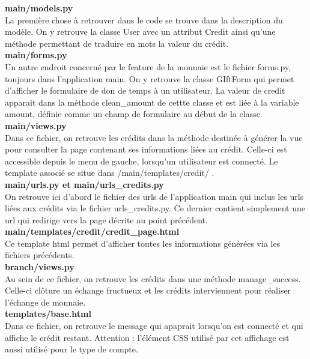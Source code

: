 \textbf{main/models.py}
\\%
La première chose à retrouver dans le code se trouve dans la description du modèle.  On y retrouve la classe User avec un attribut Credit ainsi qu'une méthode permettant de traduire en mots la valeur du crédit.
\\
\textbf{main/forms.py}
\\%
Un autre endroit concerné par le feature de la monnaie est le fichier forms.py,  toujours dans l'application main.  On y retrouve la classe GIftForm qui permet d'afficher le formulaire de don de temps à un utilisateur.  La valeur de credit apparait dans la méthode clean\_amount de cettte classe et est liée à la variable amount,  définie comme un champ de formulaire au début de la classe.
\\
\textbf{main/views.py}
\\%
Dans ce fichier,  on retrouve les crédits dans la méthode destinée à générer la vue pour consulter la page contenant ses informations liées au crédit.  Celle-ci est accessible depuis le menu de gauche,  lorsqu'un utilisateur est connecté.  Le template associé se situe dans /main/templates/credit/ .
\\
\textbf{main/urls.py et main/urls\_credits.py}
\\%
On retrouve ici d'abord le fichier des urls de l'application main qui inclus les urls liées aux crédits via le fichier urls\_credits.py.  Ce dernier contient simplement une url qui redirige vers la page décrite au point précédent.
\\
\textbf{main/templates/credit/credit\_page.html}
\\%
Ce template html permet d'afficher toutes les informations générées via les fichiers précédents.
\\
\textbf{branch/views.py}
\\%
Au sein de ce fichier,   on retrouve les crédits dans une méthode manage\_success.  Celle-ci clôture un échange fructueux et les crédits interviennent pour réaliser l'échange de monnaie.  
\\
\textbf{templates/base.html}
\\%
Dans ce fichier,  on retrouve le message qui apaprait lorsqu'on est connecté et qui affiche le crédit restant.  Attention : l'élément CSS utilisé par cet affichage est aussi utilisé pour le type de compte.   
\\
